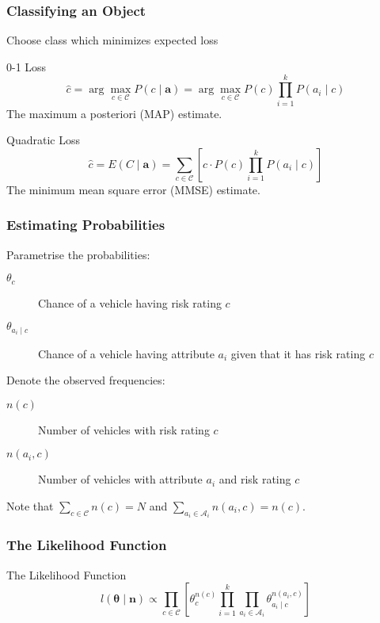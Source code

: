 \documentclass{beamer}
\begin{document}
\begin{frame}
	\frametitle{Classifying an Object}
	Choose class which minimizes expected loss
	\begin{block}{0-1 Loss}
		\begin{equation}
			\hat{c} = \arg\max_{c \in \mathcal{C}} P(c \mid \mathbf{a}) = \arg\max_{c \in \mathcal{C}} P(c)\prod_{i=1}^{k}P(a_i \mid c)
		\end{equation}
		The maximum a posteriori (MAP) estimate.
	\end{block}
	\begin{block}{Quadratic Loss}
		\begin{equation}
			\hat{c} = E(C \mid \mathbf{a}) = \sum_{c \in \mathcal{C}} \left[ c \cdot P(c)\prod_{i=1}^{k}P(a_i \mid c) \right]
		\end{equation}
		The minimum mean square error (MMSE) estimate.
	\end{block}
\end{frame}

\begin{frame}
	\frametitle{Estimating Probabilities}
	Parametrise the probabilities:
	\begin{description}
		\item[$\theta_c$] Chance of a vehicle having risk rating $c$
		\item[$\theta_{a_i \mid c}$] Chance of a vehicle having attribute $a_i$ given that it has risk rating $c$
	\end{description}\vspace{0.5em}

	Denote the observed frequencies:
	\begin{description}
		\item[$n(c)$] Number of vehicles with risk rating $c$
		\item[$n(a_i, c)$] Number of vehicles with attribute $a_i$ and risk rating $c$
	\end{description}
	Note that $\sum_{c \in \mathcal{C}}n(c) = N$ and $\sum_{a_i \in \mathcal{A}_i}n(a_i, c) = n(c)$.
\end{frame}

\begin{frame}
	\frametitle{The Likelihood Function}
	\begin{block}{The Likelihood Function}
		\begin{equation}\label{likelihood function}
			l(\mathbf{\theta} \mid \mathbf{n}) \propto \prod_{c \in \mathcal{C}} \left[ \theta_c^{n(c)} \prod_{i=1}^k \prod_{a_i \in \mathcal{A}_i} \theta_{a_i \mid c}^{n(a_i, c)} \right]
		\end{equation}
	\end{block}
\end{frame}
\end{document}
